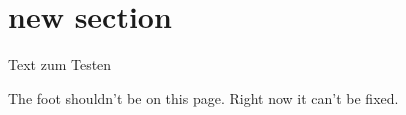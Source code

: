 \documentclass[a5paper, 11pt]{scrartcl}
\begin{document}


\section{new section}
\lipsum[1]
\begin{center}
\end{center}
\lipsum[1]



Text zum Testen 

\vskip 20pt
The foot shouldn't be on this page. Right now it can't be fixed.
\end{document}
